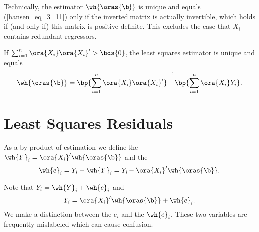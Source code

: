 Technically, the estimator $\wh{\oras{\b}}$ is unique and equals (\ref{hansen_eq_3_11}) only if the inverted matrix is actually invertible, which holds if (and only if) this matrix is positive definite. This excludes the case that $X_i$ contains redundant regressors. 
\begin{theorem} \label{hansen_thm_3_1}
    If $\sum_{i=1}^n \ora{X_i} \ora{X_i}^\prime > \bds{0}$, the least squares estimator is unique and equals
    \begin{equation}
        \notag
        \wh{\oras{\b}} = \bp{\sum_{i=1}^n \ora{X_i} \ora{X_i}^\prime}^{-1} \bp{\sum_{i=1}^n \ora{X_i} Y_i}.
    \end{equation}
\end{theorem}


\setcounter{section}{7}
\section{Least Squares Residuals}
\setcounter{equation}{13}

As a by-product of estimation we define the  $\wh{Y}_i = \ora{X_i}^\prime \wh{\oras{\b}}$ and the 
\begin{equation}
    \label{hansen_eq_3_14}
    \wh{e}_i = Y_i - \wh{Y}_i = Y_i - \ora{X_i}^\prime \wh{\oras{\b}}.
\end{equation}

Note that $Y_i = \wh{Y}_i + \wh{e}_i$ and
\begin{equation}
    \label{hansen_eq_3_15}
    Y_i = \ora{X_i}^\prime \wh{\oras{\b}} + \wh{e}_i.
\end{equation}
We make a distinction between the  $e_i$ and the  $\wh{e}_i$.  These two variables are frequently mislabeled which can cause confusion.


